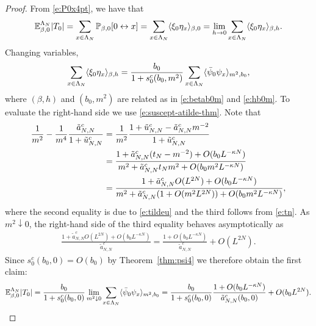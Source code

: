 \documentclass[11pt]{amsart}
\numberwithin{equation}{section}
\numberwithin{theorem}{section}
\newcommand{\conn}{\leftrightarrow}
\newcommand{\1}{{\bf 1}}
\begin{document}
\begin{proof}
From \eqref{e:P0x4pt}, we have that
\begin{equation}
 \E^{\Lambda_{N}}_{\beta,0}|T_0|=\sum_{x\in \Lambda_N}  \P_{\beta,0}[0\conn x] = \sum_{x\in \Lambda_N} \avg{\xi_0\eta_x}_{\beta,0}=\lim_{h\rightarrow 0}  \sum_{x\in \Lambda_N} \avg{\xi_0\eta_x}_{\beta,h}.
\end{equation}
Changing variables,
\begin{equation}
  \sum_{x\in\Lambda_N} \langle \xi_0\eta_x \rangle_{\beta,h}
  = \frac{b_0}{1+s_0^c(b_0,m^2)} \sum_{x\in\Lambda_N} \langle \bar\psi_0\psi_x \rangle_{m^2,b_0},
\end{equation}
where $(\beta, h)$ and $(b_0, m^2)$ are related as in \eqref{e:betab0m} and \eqref{e:hb0m}.
To evaluate the right-hand side we use \eqref{e:suscept-atilde-thm}. Note that
\begin{align}
  \frac{1}{m^2}
  - \frac{1}{m^4} 
  \frac{\tilde a_{N,N}^c}{1+\tilde u_{N,N}^c}
  &= \frac{1}{m^2}\frac{1+\tilde u_{N,N}^c - \tilde a_{N,N}^cm^{-2}}{1+\tilde u_{N,N}^c}
    \nonumber\\
  &= \frac{1+\tilde a_{N,N}^c (t_N-m^{-2})+O(b_0L^{-\kappa N})}{m^2+\tilde a_{N,N}^ct_Nm^2 + O(b_0m^2L^{-\kappa N})}
    \nonumber\\
  &= \frac{1+\tilde a_{N,N}^c O(L^{2N})+O(b_0L^{-\kappa N})}{m^2+\tilde a_{N,N}^c(1+O(m^2L^{2N})) + O(b_0m^2L^{-\kappa N})},
\end{align}
where the second equality is due to \eqref{e:tildeu} and the third follows from \eqref{e:tn}. As $m^2\downarrow 0$,
the right-hand side of the third equality behaves asymptotically as
\begin{align}
  \frac{1+\tilde a_{N,N}^c O(L^{2N})+O(b_0L^{-\kappa N})}{\tilde a_{N,N}^c}
  =
  \frac{1+O(b_0L^{-\kappa N})}{\tilde a_{N,N}^c}
  +
  O(L^{2N})
  .
\end{align}
Since $s_{0}^{c}(b_{0},0)=O(b_{0})$ by Theorem~\ref{thm:psi4} we therefore obtain the first claim:
\begin{equation}
  \mathbb{E}_{\beta,0}^{\Lambda_N}|T_0|=
  \frac{b_0}{1+s_0^c(b_0,0)}\lim_{m^2\downarrow 0} \sum_{x\in\Lambda_N} \langle \bar\psi_0\psi_x \rangle_{m^2,b_0}
  =
  \frac{b_0}{1+s_0^c(b_0,0)} \frac{1+O(b_0L^{-\kappa N})}{\tilde a_{N,N}^{c}(b_{0},0)} + O(b_0L^{2N})
  .
\end{equation}


\end{proof}
\end{document}
